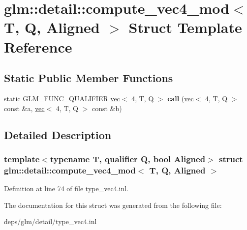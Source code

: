 \hypertarget{structglm_1_1detail_1_1compute__vec4__mod}{}\section{glm\+:\+:detail\+:\+:compute\+\_\+vec4\+\_\+mod$<$ T, Q, Aligned $>$ Struct Template Reference}
\label{structglm_1_1detail_1_1compute__vec4__mod}
\subsection*{Static Public Member Functions}
\begin{DoxyCompactItemize}
\item 
\mbox{\label{structglm_1_1detail_1_1compute__vec4__mod_a6076b5feebb458520ea9b393a8e822c1}} 
static G\+L\+M\+\_\+\+F\+U\+N\+C\+\_\+\+Q\+U\+A\+L\+I\+F\+I\+ER \hyperlink{structglm_1_1vec}{vec}$<$ 4, T, Q $>$ {\bfseries call} (\hyperlink{structglm_1_1vec}{vec}$<$ 4, T, Q $>$ const \&a, \hyperlink{structglm_1_1vec}{vec}$<$ 4, T, Q $>$ const \&b)
\end{DoxyCompactItemize}


\subsection{Detailed Description}
\subsubsection*{template$<$typename T, qualifier Q, bool Aligned$>$\newline
struct glm\+::detail\+::compute\+\_\+vec4\+\_\+mod$<$ T, Q, Aligned $>$}



Definition at line 74 of file type\+\_\+vec4.\+inl.



The documentation for this struct was generated from the following file\+:\begin{DoxyCompactItemize}
\item 
deps/glm/detail/type\+\_\+vec4.\+inl\end{DoxyCompactItemize}
